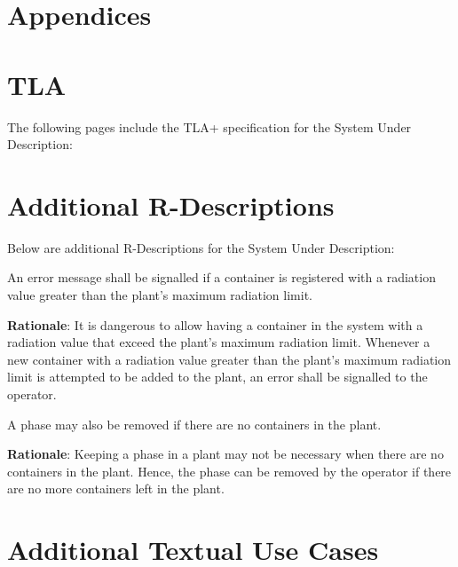 \newpage
\section{Appendices}
\appendix

\section{TLA}	\label{tla-spec}
The following pages include the TLA+ specification for the System Under Description:


\section{Additional R-Descriptions}	\label{add-rdesc}

Below are additional R-Descriptions for the System Under Description:

\rdescription
{An error message shall be signalled if a container is registered with a radiation value greater than the plant's maximum radiation limit.\\}
{}
\label{R4}

\smallskip
\noindent \textbf{Rationale}: It is dangerous to allow having a container in the system with a radiation value that exceed the plant's maximum radiation limit. Whenever a new container with a radiation value greater than the plant's maximum radiation limit is attempted to be added to the plant, an error shall be signalled to the operator.

\rdescription
{A phase may also be removed if there are no containers in the plant.\\}
{}
\label{R5}

\smallskip
\noindent \textbf{Rationale}: Keeping a phase in a plant may not be necessary when there are no containers in the plant. Hence, the phase can be removed by the operator if there are no more containers left in the plant.

\newpage
\section{Additional Textual Use Cases}	\label{add-uctd}

